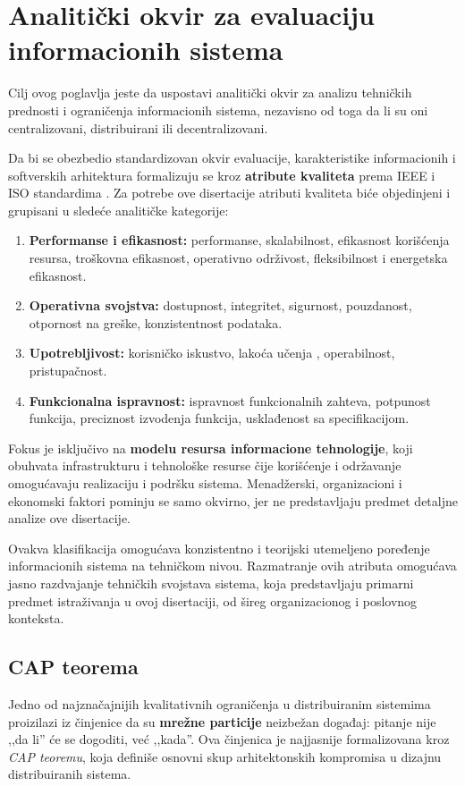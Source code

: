 \chapter{Analitički okvir za evaluaciju informacionih sistema}
Cilj ovog poglavlja jeste da uspostavi analitički okvir za analizu tehničkih prednosti i ograničenja informacionih sistema, nezavisno od toga da li su oni centralizovani, distribuirani ili decentralizovani.

Da bi se obezbedio standardizovan okvir evaluacije, karakteristike informacionih i softverskih arhitektura formalizuju se kroz \textbf{atribute kvaliteta} prema IEEE i ISO standardima \cite{bass2021software, 2013ISOI}. Za potrebe ove disertacije atributi kvaliteta biće objedinjeni i grupisani u sledeće analitičke kategorije:
\begin{enumerate}
\item \textbf{Performanse i efikasnost:} performanse, skalabilnost, efikasnost korišćenja resursa, troškovna efikasnost, operativno održivost, fleksibilnost i energetska efikasnost.
\item \textbf{Operativna svojstva:} dostupnost, integritet, sigurnost, pouzdanost, otpornost na greške, konzistentnost podataka.
\item \textbf{Upotrebljivost:} korisničko iskustvo, lakoća učenja , operabilnost, pristupačnost.
\item \textbf{Funkcionalna ispravnost:} ispravnost funkcionalnih zahteva, potpunost funkcija, preciznost izvodenja funkcija, usklađenost sa specifikacijom.
\end{enumerate}

Fokus je isključivo na \textbf{modelu resursa informacione tehnologije}, koji obuhvata infrastrukturu i tehnološke resurse čije korišćenje i održavanje omogućavaju realizaciju i podršku sistema.  Menadžerski, organizacioni i ekonomski faktori pominju se samo okvirno, jer ne predstavljaju predmet detaljne analize ove disertacije.

Ovakva klasifikacija omogućava konzistentno i teorijski utemeljeno poređenje informacionih sistema na tehničkom nivou. Razmatranje ovih atributa omogućava jasno razdvajanje tehničkih svojstava sistema, koja predstavljaju primarni predmet istraživanja u ovoj disertaciji, od šireg organizacionog i poslovnog konteksta.

\section{CAP teorema}
Jedno od najznačajnijih kvalitativnih ograničenja u distribuiranim sistemima proizilazi iz činjenice da su \textbf{mrežne particije} neizbežan događaj: pitanje nije ,,da li'' će se dogoditi, već ,,kada''. Ova činjenica je najjasnije formalizovana kroz \textit{CAP teoremu}, koja definiše osnovni skup arhitektonskih kompromisa u dizajnu distribuiranih sistema.

